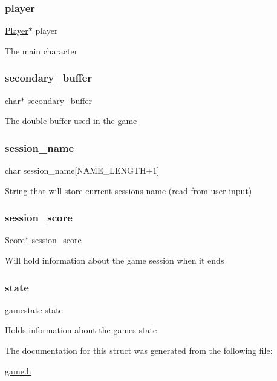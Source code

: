 \subsubsection{\texorpdfstring{player}{player}}
{\footnotesize\ttfamily \hyperlink{struct_player}{Player}$\ast$ player}

The main character \hypertarget{struct_game_a1820f1e9a26c0253b13be1df94052ca1}{}\label{struct_game_a1820f1e9a26c0253b13be1df94052ca1} 
\subsubsection{\texorpdfstring{secondary\+\_\+buffer}{secondary\_buffer}}
{\footnotesize\ttfamily char$\ast$ secondary\+\_\+buffer}

The double buffer used in the game \hypertarget{struct_game_a744d78025079ffc153f0be03356efdbe}{}\label{struct_game_a744d78025079ffc153f0be03356efdbe} 
\subsubsection{\texorpdfstring{session\+\_\+name}{session\_name}}
{\footnotesize\ttfamily char session\+\_\+name\mbox{[}N\+A\+M\+E\+\_\+\+L\+E\+N\+G\+TH+1\mbox{]}}

String that will store current session\textquotesingle{}s name (read from user input) \hypertarget{struct_game_ad7d780df0071261da7a401c839fa8a66}{}\label{struct_game_ad7d780df0071261da7a401c839fa8a66} 
\subsubsection{\texorpdfstring{session\+\_\+score}{session\_score}}
{\footnotesize\ttfamily \hyperlink{struct_score}{Score}$\ast$ session\+\_\+score}

Will hold information about the game session when it ends \hypertarget{struct_game_abb14911062a24c4178eb0f62fca2b925}{}\label{struct_game_abb14911062a24c4178eb0f62fca2b925} 
\subsubsection{\texorpdfstring{state}{state}}
{\footnotesize\ttfamily \hyperlink{group__game_ga33d4db650f69082296cc8c864c785e15}{gamestate} state}

Holds information about the game\textquotesingle{}s state 

The documentation for this struct was generated from the following file\+:\begin{DoxyCompactItemize}
\item 
\hyperlink{game_8h}{game.\+h}\end{DoxyCompactItemize}
